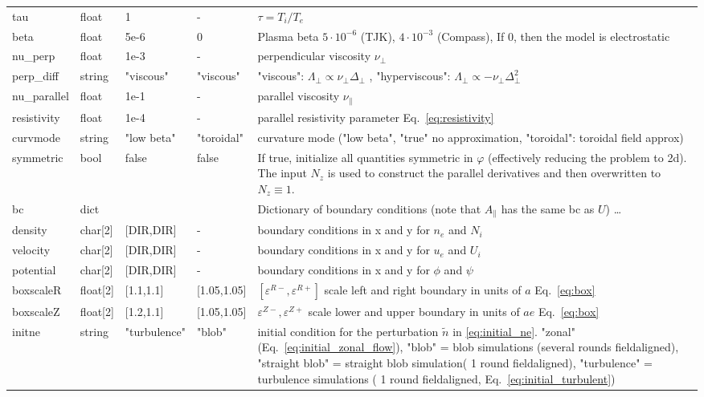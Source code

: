 \begin{longtable}{llll>{\RaggedRight}p{6cm}}
tau        & float &1      & - & $\tau = T_i/T_e$  \\
beta       & float & 5e-6  & 0 & Plasma beta $5\cdot 10^{-6}$ (TJK), $4\cdot 10^{-3}$ (Compass), If $0$, then the model is electrostatic \\
nu\_perp   & float &1e-3   & - & perpendicular viscosity $\nu_\perp$ \\
perp\_diff & string & "viscous" & "viscous" & "viscous": $\Lambda_\perp\propto \nu_\perp\Delta_\perp$ , "hyperviscous": $\Lambda_\perp \propto -\nu_\perp\Delta_\perp^2$\\
nu\_parallel & float &1e-1 & - & parallel viscosity $\nu_\parallel$ \\
resistivity & float &1e-4  & - & parallel resistivity parameter Eq.~\eqref{eq:resistivity}\\
curvmode  & string & "low beta"  & "toroidal"& curvature mode ("low beta", "true" no approximation, "toroidal": toroidal field approx) \\
symmetric & bool & false & false & If true, initialize all quantities symmetric in $\varphi$ (effectively reducing the problem to 2d). The input $N_z$ is used to construct the parallel derivatives and then overwritten to $N_z\equiv 1$. \\
bc & dict & & & Dictionary of boundary conditions (note that $A_\parallel$ has the same bc as $U$) \ldots\\
\qquad density   & char[2] & [DIR,DIR] & -  & boundary conditions in x and y for $n_e$ and $N_i$\\
\qquad velocity  & char[2] & [DIR,DIR] & - & boundary conditions in x and y for $u_e$ and $U_i$\\
\qquad potential & char[2] & [DIR,DIR] & - & boundary conditions in x and y for $\phi$ and $\psi$\\
    boxscaleR  & float[2] & [1.1,1.1]     & [1.05,1.05] & $[\varepsilon^{R-}, \varepsilon^{R+}]$ scale left and right boundary in units of $a$ Eq.~\eqref{eq:box}\\
    boxscaleZ  & float[2] & [1.2,1.1]     & [1.05,1.05] & $\varepsilon^{Z-}, \varepsilon^{Z+}$ scale lower and upper boundary in units of $ae$ Eq.~\eqref{eq:box} \\
initne    & string & "turbulence"     & "blob"  & initial condition for the
perturbation $\tilde n$ in \eqref{eq:initial_ne}. "zonal" (Eq.~\eqref{eq:initial_zonal_flow}),
    "blob" = blob simulations (several rounds fieldaligned),
    "straight blob" = straight blob simulation( 1 round fieldaligned),
    "turbulence" = turbulence simulations ( 1 round fieldaligned, Eq.~\eqref{eq:initial_turbulent})\\

\end{longtable}
